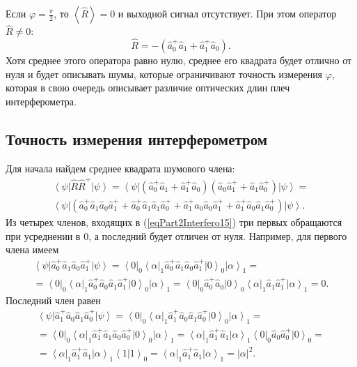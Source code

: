 Если $\varphi = \frac{\pi}{2}$, то $\left<\hat{R}\right> = 0$ и
выходной сигнал отсутствует. При этом оператор $\hat{R} \ne 0$:
\[
\hat{R} = 
-
\left(
\hat{a}_0^{+} \hat{a}_1 + 
\hat{a}_1^{+} \hat{a}_0
\right).
\]
Хотя среднее этого оператора равно нулю, среднее его квадрата будет
отлично от нуля и будет описывать шумы, которые ограничивают точность
измерения $\varphi$, которая в свою очередь описывает различие
оптических длин плеч интерферометра.

\subsection{Точность измерения интерферометром}

Для начала найдем среднее квадрата шумового члена:
\begin{eqnarray}
\left<\psi\right|\hat{R}\hat{R}^{+}\left|\psi\right> = 
\left<\psi\right|
\left(
\hat{a}_0^{+} \hat{a}_1 + 
\hat{a}_1^{+} \hat{a}_0
\right)
\left(
\hat{a}_0 \hat{a}_1^{+} +
\hat{a}_1 \hat{a}_0^{+}
\right)
\left|\psi\right> = 
\nonumber \\
\left<\psi\right|
\left(
\hat{a}_0^{+} \hat{a}_1 
\hat{a}_0 \hat{a}_1^{+} 
+ 
\hat{a}_0^{+} \hat{a}_1 
\hat{a}_1 \hat{a}_0^{+}
+
\hat{a}_1^{+} \hat{a}_0
\hat{a}_0 \hat{a}_1^{+} 
+
\hat{a}_1^{+} \hat{a}_0
\hat{a}_1 \hat{a}_0^{+}
\right)
\left|\psi\right>.
\label{eqPart2Interfero15}
\end{eqnarray}
Из четырех членов, входящих в (\ref{eqPart2Interfero15}) три первых
обращаются при усреднении в 0, а последний будет отличен от нуля.
Например, для первого члена имеем
\begin{eqnarray}
\left<\psi\right|
\hat{a}_0^{+} \hat{a}_1 
\hat{a}_0 \hat{a}_1^{+} 
\left|\psi\right> = 
\left<0\right|_0\left<\alpha\right|_1
\hat{a}_0^{+} \hat{a}_1 
\hat{a}_0 \hat{a}_1^{+} 
\left|0\right>_0\left|\alpha\right>_1 =
\nonumber \\
=
\left<0\right|_0\left<\alpha\right|_1
\hat{a}_0^{+} \hat{a}_0 
\hat{a}_1 \hat{a}_1^{+} 
\left|0\right>_0\left|\alpha\right>_1 =
\left<0\right|_0
\hat{a}_0^{+} \hat{a}_0 
\left|0\right>_0
\left<\alpha\right|_1
\hat{a}_1 \hat{a}_1^{+} 
\left|\alpha\right>_1 =
0.
\nonumber
\end{eqnarray}
Последний член равен
\begin{eqnarray}
\left<\psi\right|
\hat{a}_1^{+} \hat{a}_0
\hat{a}_1 \hat{a}_0^{+}
\left|\psi\right> = 
\left<0\right|_0\left<\alpha\right|_1
\hat{a}_1^{+} \hat{a}_0
\hat{a}_1 \hat{a}_0^{+}
\left|0\right>_0\left|\alpha\right>_1 =
\nonumber \\
=
\left<0\right|_0\left<\alpha\right|_1
\hat{a}_1^{+} \hat{a}_1 
\hat{a}_0 \hat{a}_0^{+}
\left|0\right>_0\left|\alpha\right>_1 =
\left<\alpha\right|_1
\hat{a}_1^{+} \hat{a}_1 
\left|\alpha\right>_1 
\left<0\right|_0
\hat{a}_0 \hat{a}_0^{+}
\left|0\right>_0 =
\nonumber \\
=
\left<\alpha\right|_1
\hat{a}_1^{+} \hat{a}_1 
\left|\alpha\right>_1 
\left<1\right.
\left|1\right>_0 =
\left<\alpha\right|_1
\hat{a}_1^{+} \hat{a}_1 
\left|\alpha\right>_1 
= \left|\alpha\right|^2.
\end{eqnarray}

